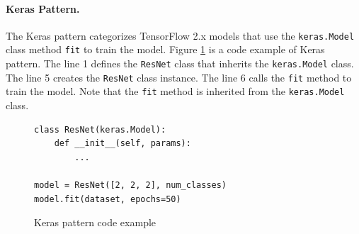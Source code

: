 


\paragraph{Keras Pattern.}
The Keras pattern categorizes TensorFlow 2.x models that use
the {\tt keras.Model} class method {\tt fit} to train the model. 
Figure \ref{fig:keraspattern} is a code example of Keras pattern.
The line 1 defines the {\tt ResNet} class that inherits the 
{\tt keras.Model} class. 
The line 5 creates the {\tt ResNet} class instance.
The line 6 calls the {\tt fit} method to train the model.
Note that the {\tt fit} method is inherited from the {\tt keras.Model} class.
\vspace{-1em} 

\begin{figure}[ht!]
  \begin{lstlisting}[style=mpython]
class ResNet(keras.Model):
    def __init__(self, params):
        ...

model = ResNet([2, 2, 2], num_classes)
model.fit(dataset, epochs=50)\end{lstlisting}
 
  \caption{Keras pattern code example}
  \label{fig:keraspattern}
\end{figure}
\vspace{-1em} 


